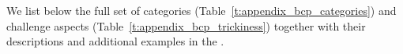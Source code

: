 \section{\bcp{}}
\label{secs:appendix_bcp}
We list below the full set of categories (Table~\ref{t:appendix_bcp_categories}) and challenge aspects (Table~\ref{t:appendix_bcp_trickiness}) together with their descriptions and additional examples in the \bcpa{}.

